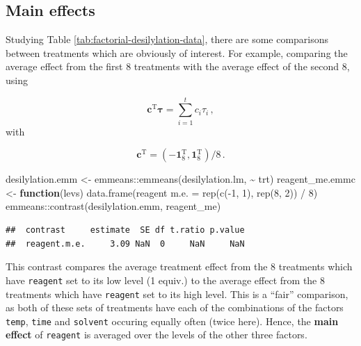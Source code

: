 \documentclass[
]{book}
\newenvironment{Shaded}{\begin{snugshade}}{\end{snugshade}}
\newcommand{\ControlFlowTok}[1]{\textcolor[rgb]{0.13,0.29,0.53}{\textbf{#1}}}
\newcommand{\DecValTok}[1]{\textcolor[rgb]{0.00,0.00,0.81}{#1}}
\newcommand{\FunctionTok}[1]{\textcolor[rgb]{0.00,0.00,0.00}{#1}}
\newcommand{\NormalTok}[1]{#1}
\newcommand{\OtherTok}[1]{\textcolor[rgb]{0.56,0.35,0.01}{#1}}
\newcommand{\SpecialCharTok}[1]{\textcolor[rgb]{0.00,0.00,0.00}{#1}}
\newcommand{\StringTok}[1]{\textcolor[rgb]{0.31,0.60,0.02}{#1}}
\theoremstyle{definition}
\theoremstyle{definition}
\theoremstyle{definition}
\theoremstyle{definition}
\theoremstyle{remark}
\begin{document}
\hypertarget{main-effects}{%
\subsection{Main effects}\label{main-effects}}

Studying Table \ref{tab:factorial-desilylation-data}, there are some comparisons between treatments which are obviously of interest. For example, comparing the average effect from the first 8 treatments with the average effect of the second 8, using

\[
\boldsymbol{c}^{\mathrm{T}}\boldsymbol{\tau} = \sum_{i=1}^tc_i\tau_i\,,
\]
with

\[
\boldsymbol{c}^{\mathrm{T}} = (-\boldsymbol{1}_8^{\mathrm{T}}, \boldsymbol{1}_8^{\mathrm{T}}) / 8\,.
\]

\begin{Shaded}
\begin{Highlighting}[]
\NormalTok{desilylation.emm }\OtherTok{\textless{}{-}}\NormalTok{ emmeans}\SpecialCharTok{::}\FunctionTok{emmeans}\NormalTok{(desilylation.lm, }\SpecialCharTok{\textasciitilde{}}\NormalTok{ trt)}
\NormalTok{reagent\_me.emmc }\OtherTok{\textless{}{-}} \ControlFlowTok{function}\NormalTok{(levs) }\FunctionTok{data.frame}\NormalTok{(}\StringTok{\textquotesingle{}reagent m.e.\textquotesingle{}} \OtherTok{=} \FunctionTok{rep}\NormalTok{(}\FunctionTok{c}\NormalTok{(}\SpecialCharTok{{-}}\DecValTok{1}\NormalTok{, }\DecValTok{1}\NormalTok{), }\FunctionTok{rep}\NormalTok{(}\DecValTok{8}\NormalTok{, }\DecValTok{2}\NormalTok{)) }\SpecialCharTok{/} \DecValTok{8}\NormalTok{)}
\NormalTok{emmeans}\SpecialCharTok{::}\FunctionTok{contrast}\NormalTok{(desilylation.emm, }\StringTok{\textquotesingle{}reagent\_me\textquotesingle{}}\NormalTok{)}
\end{Highlighting}
\end{Shaded}

\begin{verbatim}
##  contrast     estimate  SE df t.ratio p.value
##  reagent.m.e.     3.09 NaN  0     NaN     NaN
\end{verbatim}

This contrast compares the average treatment effect from the 8 treatments which have \texttt{reagent} set to its low level (1 equiv.) to the average effect from the 8 treatments which have \texttt{reagent} set to its high level. This is a ``fair'' comparison, as both of these sets of treatments have each of the combinations of the factors \texttt{temp}, \texttt{time} and \texttt{solvent} occuring equally often (twice here). Hence, the \textbf{main effect} of \texttt{reagent} is averaged over the levels of the other three factors.
\end{document}
